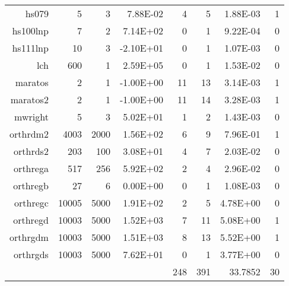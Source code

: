 \begin{table}[htbp]
\begin{tabular}{rrrrrrrr}
    hs079 & 5     & 3     & 7.88E-02 & 4     & 5     & 1.88E-03 & 1 \\
    hs100lnp & 7     & 2     & 7.14E+02 & 0     & 1     & 9.22E-04 & 0 \\
    hs111lnp & 10    & 3     & -2.10E+01 & 0     & 1     & 1.07E-03 & 0 \\
    lch   & 600   & 1     & 2.59E+05 & 0     & 1     & 1.53E-02 & 0 \\
    maratos & 2     & 1     & -1.00E+00 & 11    & 13    & 3.14E-03 & 1 \\
    maratos2 & 2     & 1     & -1.00E+00 & 11    & 14    & 3.28E-03 & 1 \\
    mwright & 5     & 3     & 5.02E+01 & 1     & 2     & 1.43E-03 & 0 \\
    orthrdm2 & 4003  & 2000  & 1.56E+02 & 6     & 9     & 7.96E-01 & 1 \\
    orthrds2 & 203   & 100   & 3.08E+01 & 4     & 7     & 2.03E-02 & 0 \\
    orthrega & 517   & 256   & 5.92E+02 & 2     & 4     & 2.96E-02 & 0 \\
    orthregb & 27    & 6     & 0.00E+00 & 0     & 1     & 1.08E-03 & 0 \\
    orthregc & 10005 & 5000  & 1.91E+02 & 2     & 5     & 4.78E+00 & 0 \\
    orthregd & 10003 & 5000  & 1.52E+03 & 7     & 11    & 5.08E+00 & 1 \\
    orthrgdm & 10003 & 5000  & 1.51E+03 & 8     & 13    & 5.52E+00 & 1 \\
    orthrgds & 10003 & 5000  & 7.62E+01 & 0     & 1     & 3.77E+00 & 0 \\
          &       &       &       & 248   & 391   & 33.7852 & 30 \\
    \bottomrule
    \end{tabular}%
  \label{tab:addlabel}%
\end{table}%
